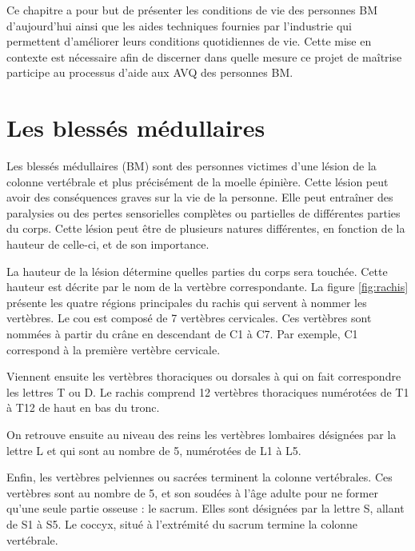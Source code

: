 \documentclass[letterpaper, twoside, 12pt, memoire, creativecommons, hyperref]{thETS}
\begin{document}
Ce chapitre a pour but de présenter les conditions de vie des personnes BM d'aujourd'hui ainsi que les aides techniques fournies par l'industrie qui permettent d'améliorer leurs conditions quotidiennes de vie. Cette mise en contexte est nécessaire afin de discerner dans quelle mesure ce projet de maîtrise participe au processus d'aide aux AVQ des personnes BM.


\section{Les blessés médullaires}

Les blessés médullaires (BM) sont des personnes victimes d'une lésion de la colonne vertébrale et plus précisément de la moelle épinière. Cette lésion peut avoir des conséquences graves sur la vie de la personne. Elle peut entraîner des paralysies ou des pertes sensorielles complètes ou partielles de différentes parties du corps. Cette lésion peut être de plusieurs natures différentes, en fonction de la hauteur de celle-ci, et de son importance. 

La hauteur de la lésion détermine quelles parties du corps sera touchée. Cette hauteur est décrite par le nom de la vertèbre correspondante. La figure \ref{fig:rachis} présente les quatre régions principales du rachis qui servent à nommer les vertèbres. Le cou est composé de 7 vertèbres cervicales. Ces vertèbres sont nommées à partir du crâne en descendant de C1 à C7. Par exemple, C1 correspond à la première vertèbre cervicale. 

Viennent ensuite les vertèbres thoraciques ou dorsales à qui on fait correspondre les lettres T ou D. Le rachis comprend 12 vertèbres thoraciques numérotées de T1 à T12 de haut en bas du tronc. 

On retrouve ensuite au niveau des reins les vertèbres lombaires désignées par la lettre L et qui sont au nombre de 5, numérotées de L1 à L5. 

Enfin, les vertèbres pelviennes ou sacrées terminent la colonne vertébrales. Ces vertèbres sont au nombre de 5, et son soudées à l'âge adulte pour ne former qu'une seule partie osseuse : le sacrum. Elles sont désignées par la lettre S, allant de S1 à S5. Le coccyx, situé à l'extrémité du sacrum termine la colonne vertébrale.
\end{document}
